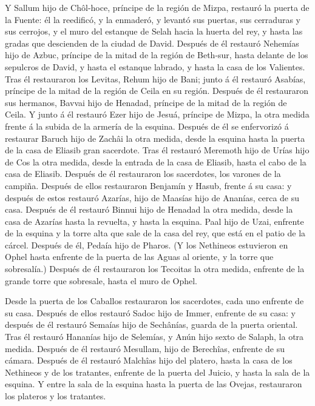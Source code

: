  Y Sallum hijo de Chôl-hoce, príncipe de la región de
Mizpa, restauró la puerta de la Fuente: él la reedificó, y la enmaderó,
y levantó sus puertas, sus cerraduras y sus cerrojos, y el muro del
estanque de Selah hacia la huerta del rey, y hasta las gradas que
descienden de la ciudad de David.  Después de él restauró
Nehemías hijo de Azbuc, príncipe de la mitad de la región de Beth-sur,
hasta delante de los sepulcros de David, y hasta el estanque labrado, y
hasta la casa de los Valientes.  Tras él restauraron los
Levitas, Rehum hijo de Bani; junto á él restauró Asabías, príncipe de la
mitad de la región de Ceila en su región.  Después de él
restauraron sus hermanos, Bavvai hijo de Henadad, príncipe de la mitad
de la región de Ceila.  Y junto á él restauró Ezer hijo
de Jesuá, príncipe de Mizpa, la otra medida frente á la subida de la
armería de la esquina.  Después de él se enfervorizó á
restaurar Baruch hijo de Zachâi la otra medida, desde la esquina hasta
la puerta de la casa de Eliasib gran sacerdote.  Tras él
restauró Meremoth hijo de Urías hijo de Cos la otra medida, desde la
entrada de la casa de Eliasib, hasta el cabo de la casa de Eliasib.
 Después de él restauraron los sacerdotes, los varones de
la campiña.  Después de ellos restauraron Benjamín y
Hasub, frente á su casa: y después de estos restauró Azarías, hijo de
Maasías hijo de Ananías, cerca de su casa.  Después de él
restauró Binnui hijo de Henadad la otra medida, desde la casa de Azarías
hasta la revuelta, y hasta la esquina.  Paal hijo de
Uzai, enfrente de la esquina y la torre alta que sale de la casa del
rey, que está en el patio de la cárcel. Después de él, Pedaía hijo de
Pharos.  (Y los Nethineos estuvieron en Ophel hasta
enfrente de la puerta de las Aguas al oriente, y la torre que
sobresalía.)  Después de él restauraron los Tecoitas la
otra medida, enfrente de la grande torre que sobresale, hasta el muro de
Ophel.

 Desde la puerta de los Caballos restauraron los
sacerdotes, cada uno enfrente de su casa.  Después de
ellos restauró Sadoc hijo de Immer, enfrente de su casa: y después de él
restauró Semaías hijo de Sechânías, guarda de la puerta oriental.
 Tras él restauró Hananías hijo de Selemías, y Anún hijo
sexto de Salaph, la otra medida. Después de él restauró Mesullam, hijo
de Berechîas, enfrente de su cámara.  Después de él
restauró Malchîas hijo del platero, hasta la casa de los Nethineos y de
los tratantes, enfrente de la puerta del Juicio, y hasta la sala de la
esquina.  Y entre la sala de la esquina hasta la puerta
de las Ovejas, restauraron los plateros y los tratantes.

